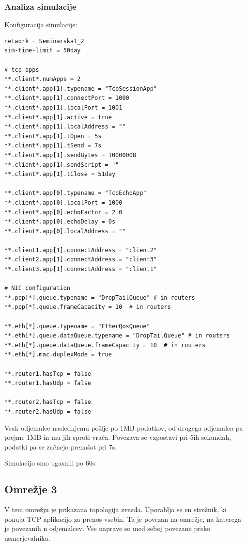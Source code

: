 \documentclass[11pt,a4paper,slovene]{myarticle}
\begin{document}
\subsubsection{Analiza simulacije}

Konfiguracija simulacije:

\begin{lstlisting}
network = Seminarska1_2
sim-time-limit = 50day

# tcp apps
**.client*.numApps = 2
**.client*.app[1].typename = "TcpSessionApp"
**.client*.app[1].connectPort = 1000
**.client*.app[1].localPort = 1001
**.client*.app[1].active = true
**.client*.app[1].localAddress = ""
**.client*.app[1].tOpen = 5s
**.client*.app[1].tSend = 7s
**.client*.app[1].sendBytes = 1000000B
**.client*.app[1].sendScript = ""
**.client*.app[1].tClose = 51day

**.client*.app[0].typename = "TcpEchoApp"
**.client*.app[0].localPort = 1000
**.client*.app[0].echoFactor = 2.0
**.client*.app[0].echoDelay = 0s
**.client*.app[0].localAddress = ""

**.client1.app[1].connectAddress = "client2"
**.client2.app[1].connectAddress = "client3"
**.client3.app[1].connectAddress = "client1"

# NIC configuration
**.ppp[*].queue.typename = "DropTailQueue" # in routers
**.ppp[*].queue.frameCapacity = 10  # in routers

**.eth[*].queue.typename = "EtherQosQueue"
**.eth[*].queue.dataQueue.typename = "DropTailQueue" # in routers
**.eth[*].queue.dataQueue.frameCapacity = 10  # in routers
**.eth[*].mac.duplexMode = true

**.router1.hasTcp = false
**.router1.hasUdp = false

**.router2.hasTcp = false
**.router2.hasUdp = false
\end{lstlisting}

Vsak odjemalec naslednjemu pošlje po 1MB podatkov, od drugega odjemalca pa prejme 1MB in mu jih sproti vrača. Povezava se vzpostavi pri 5ih sekundah, podatki pa se začnejo prenašat pri 7s.

Simulacijo smo ugasnili po 60s.







\subsection{Omrežje 3}
V tem omrežju je prikazana topologija zvezda. Uporablja se en strežnik, ki ponuja TCP aplikacijo za prenos vsebin. Ta je povezan na omrežje,
na katerega je povezanih n odjemalcev. Vse naprave so med seboj povezane preko usmerjevalnika.
\end{document}
